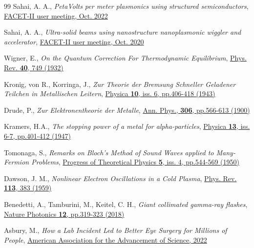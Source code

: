 \documentclass[aps,twocolumn,notitlepage,superscriptaddress]{revtex4-1}
\begin{document}
\begin{thebibliography}{99}
Sahai, A. A.,
	\textit{PetaVolts per meter plasmonics using structured semiconductors},
	\href{https://www-lcls.slac.stanford.edu/web/FACET/pac meetings/pac2022/SAHAI_Plasmonics_FACET-II_2022_Nano2WA_proposal_0.pdf}{FACET-II user meeting, Oct. 2022}

Sahai, A. A.,
	\textit{Ultra-solid beams using nanostructure nanoplasmonic wiggler and accelerator},
	\href{https://www-lcls.slac.stanford.edu/web/FACET/pac meetings/pac2020/FACET-II_PAC_committee_answers_nano2WA_proposal_Sahai.pdf}{FACET-II user meeting, Oct. 2020}

Wigner, E.,
	\textit{On the Quantum Correction For Thermodynamic Equilibrium},
	\href{https://doi.org/10.1103/PhysRev.40.749}{Phys. Rev. {\bf 40}, 749 (1932)}
	
Kronig, von R., Korringa, J.,
	\textit{Zur Theorie der Bremsung Schneller Geladener Teilchen in Metallischen Leitern},
	\href{https://doi.org/10.1016/S0031-8914(43)90032-1}{Physica {\bf 10}, iss. 6, pp.406-418 (1943)}
	
Drude, P., 
	\textit{Zur Elektronentheorie der Metalle},
	\href{https://doi.org/10.1002/andp.19003060312}{Ann. Phys., {\bf 306}, pp.566-613 (1900)}

Kramers, H.A.,
	\textit{The stopping power of a metal for alpha-particles},
	\href{https://doi.org/10.1016/0031-8914(47)90014-1}{Physica {\bf 13}, iss. 6-7, pp.401-412 (1947)}
	
Tomonaga, S.,
	\textit{Remarks on Bloch's Method of Sound Waves applied to Many-Fermion Problems},
	\href{https://doi.org/10.1143/ptp/5.4.544}{Progress of Theoretical Physics {\bf 5}, iss. 4, pp.544-569 (1950)}
		
Dawson, J. M.,
	\textit{Nonlinear Electron Oscillations in a Cold Plasma},
	\href{https://doi.org/10.1103/PhysRev.113.383}{Phys. Rev. {\bf 113}, 383 (1959)}
	
Benedetti, A., Tamburini, M., Keitel, C. H.,
	\textit{Giant collimated gamma-ray flashes},
	\href{https://doi.org/10.1038/s41566-018-0139-y}{Nature Photonics {\bf 12}, pp.319-323 (2018)}
	 
Asbury, M.,
	\textit{How a Lab Incident Led to Better Eye Surgery for Millions of People},
	\href{https://www.goldengooseaward.org/01awardees/lasik}{American Association for the Advancement of Science, 2022}
	

\end{thebibliography}
\end{document}
